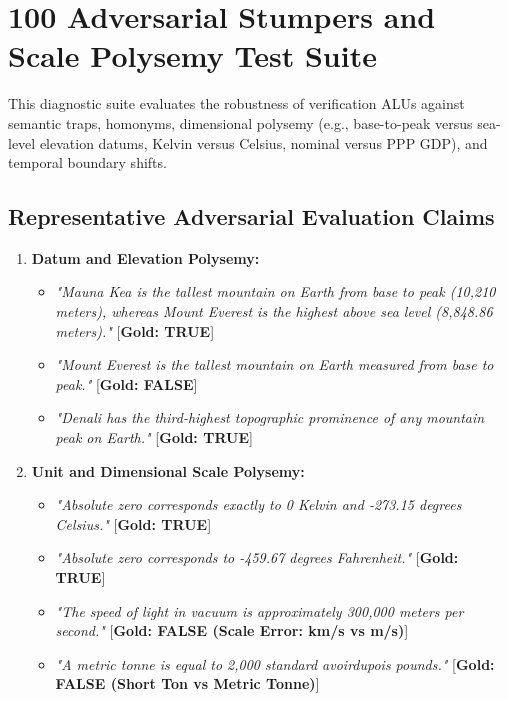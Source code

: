 \chapter{100 Adversarial Stumpers and Scale Polysemy Test Suite}
\label{app:adversarial_stumpers}

This diagnostic suite evaluates the robustness of verification ALUs against semantic traps, homonyms, dimensional polysemy (e.g., base-to-peak versus sea-level elevation datums, Kelvin versus Celsius, nominal versus PPP GDP), and temporal boundary shifts.

\section{Representative Adversarial Evaluation Claims}

\begin{enumerate}
    \item \textbf{Datum and Elevation Polysemy:}
    \begin{itemize}
        \item \textit{"Mauna Kea is the tallest mountain on Earth from base to peak (10,210 meters), whereas Mount Everest is the highest above sea level (8,848.86 meters)."} \hfill [\textbf{Gold: TRUE}]
        \item \textit{"Mount Everest is the tallest mountain on Earth measured from base to peak."} \hfill [\textbf{Gold: FALSE}]
        \item \textit{"Denali has the third-highest topographic prominence of any mountain peak on Earth."} \hfill [\textbf{Gold: TRUE}]
    \end{itemize}
    
    \item \textbf{Unit and Dimensional Scale Polysemy:}
    \begin{itemize}
        \item \textit{"Absolute zero corresponds exactly to 0 Kelvin and -273.15 degrees Celsius."} \hfill [\textbf{Gold: TRUE}]
        \item \textit{"Absolute zero corresponds to -459.67 degrees Fahrenheit."} \hfill [\textbf{Gold: TRUE}]
        \item \textit{"The speed of light in vacuum is approximately 300,000 meters per second."} \hfill [\textbf{Gold: FALSE (Scale Error: km/s vs m/s)}]
        \item \textit{"A metric tonne is equal to 2,000 standard avoirdupois pounds."} \hfill [\textbf{Gold: FALSE (Short Ton vs Metric Tonne)}]
    \end{itemize}
    

\end{enumerate}
